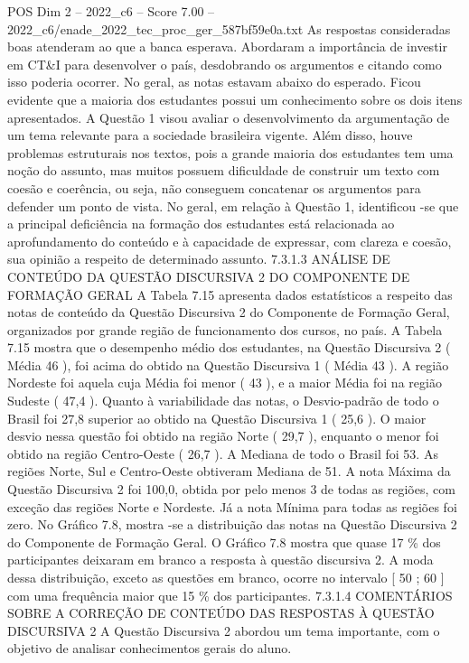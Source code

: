 \begin{textsample}{POS Dim 2 – 2022\_c6 – Score 7.00 – 2022\_c6/enade\_2022\_tec\_proc\_ger\_587bf59e0a.txt}
As respostas consideradas boas atenderam ao que a banca esperava.
Abordaram a importância de investir em CT\&I para desenvolver o país, desdobrando os argumentos e citando como isso poderia ocorrer.
No geral, as notas estavam abaixo do esperado.
Ficou evidente que a maioria dos estudantes possui um conhecimento sobre os dois itens apresentados.
A Questão 1 visou avaliar o desenvolvimento da argumentação de um tema relevante para a sociedade brasileira vigente.
Além disso, houve problemas estruturais nos textos, pois a grande maioria dos estudantes tem uma noção do assunto, mas muitos possuem dificuldade de construir um texto com coesão e coerência, ou seja, não conseguem concatenar os argumentos para defender um ponto de vista.
No geral, em relação à Questão 1, identificou -se que a principal deficiência na formação dos estudantes está relacionada ao aprofundamento do conteúdo e à capacidade de expressar, com clareza e coesão, sua opinião a respeito de determinado assunto. 7.3.1.3 ANÁLISE DE CONTEÚDO DA QUESTÃO DISCURSIVA 2 DO COMPONENTE DE FORMAÇÃO GERAL A Tabela 7.15 apresenta dados estatísticos a respeito das notas de conteúdo da Questão Discursiva 2 do Componente de Formação Geral, organizados por grande região de funcionamento dos cursos, no país.
A Tabela 7.15 mostra que o desempenho médio dos estudantes, na Questão Discursiva 2 ( Média 46 ), foi acima do obtido na Questão Discursiva 1 ( Média 43 ).
A região Nordeste foi aquela cuja Média foi menor ( 43 ), e a maior Média foi na região Sudeste ( 47,4 ).
Quanto à variabilidade das notas, o Desvio-padrão de todo o Brasil foi 27,8 superior ao obtido na Questão Discursiva 1 ( 25,6 ).
O maior desvio nessa questão foi obtido na região Norte ( 29,7 ), enquanto o menor foi obtido na região Centro-Oeste ( 26,7 ).
A Mediana de todo o Brasil foi 53.
As regiões Norte, Sul e Centro-Oeste obtiveram Mediana de 51.
A nota Máxima da Questão Discursiva 2 foi 100,0, obtida por pelo menos 3 de todas as regiões, com exceção das regiões Norte e Nordeste.
Já a nota Mínima para todas as regiões foi zero.
No Gráfico 7.8, mostra -se a distribuição das notas na Questão Discursiva 2 do Componente de Formação Geral.
O Gráfico 7.8 mostra que quase 17 \% dos participantes deixaram em branco a resposta à questão discursiva 2.
A moda dessa distribuição, exceto as questões em branco, ocorre no intervalo [ 50 ; 60 ] com uma frequência maior que 15 \% dos participantes. 7.3.1.4 COMENTÁRIOS SOBRE A CORREÇÃO DE CONTEÚDO DAS RESPOSTAS À QUESTÃO DISCURSIVA 2 A Questão Discursiva 2 abordou um tema importante, com o objetivo de analisar conhecimentos gerais do aluno.

\end{textsample}
